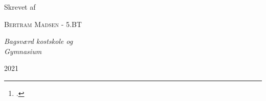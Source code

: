 \documentclass[a4paper, 8pt, oneside]{article} %
\newcommand{\plogo}{\fbox{$\mathcal{BM}$}}
\begin{document}
\begin{titlepage}
	
	Skrevet af
	
	\vspace{0.5\baselineskip} %
	
	{\scshape\Large Bertram Madsen - 5.BT} %
	
	\vspace{0.5\baselineskip} %
	
	\textit{Bagsværd kostskole og\\ Gymnasium} %
	
	\vfill %
	
	
	\plogo %
	
	\vspace{0.3\baselineskip} %
	
	2021 %
	
\end{titlepage}

\newpage
\tableofcontents
\newpage

\newpage
\begin{abstract}
	En demokratisk samfundstruktur er noget vi ser spille absolut central rolle i langt de fleste vestlige samfund, og noget som - til en vis grad - lægger til grund for næsten alle beslutninger og ændringer der idag bliver fortaget på landsplan i langt de fleste lande i hele verden.\footcite{desilver_despite_nodate}. På trods af dette er demokratiske proccessor - som bl.a. eksemplificeret ved det danske folktingsvalg - ikke nogle processor som får særligt meget opmærksomhed, og har derfor i stor grad ikke fulgt med den teknologiske udvikling som ellers har præget resten af de vestlige samfund.\\
    
	Dette projekt arbejder med at forsøge at belyse udfordringerne ved traditionelle valg, både i form af dem vi ser udelukkende ved brug af klassiske metoder som i Danmark, samt delvist digitaliserede valg som vi ser dem f.eks. i USA. I forbindelse med dette opstilles der et potentielt løsningsforslag ved brug af moderne blockchain teknologier, der redegøres for matematiken bag som gør det muligt og der diskuteres potentielle udfordringer ved denne type løsning og hvordan disse muligvis kan imødekommes.
\end{abstract}
\end{document}
